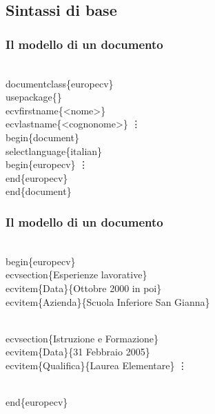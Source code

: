\documentclass[svgnames,%
	ucs,%
	pdftex]{guitbeamer}
\begin{document}
\subsection{Sintassi di base}
\begin{frame}
  \frametitle{Il modello di un documento}
	\begin{LaTeXcode}
		\\documentclass\{\alert{europecv}\}\n
	  \onslide<2->
		\\usepackage\{<nome-package>\}\n
	  \onslide<3->
		\alert{\\ecvfirstname\{}<nome>\alert{\}}\n
		\alert{\\ecvlastname\{}<cognonome>\alert{\}}\n
		\hspace*{10ex}\vdots\n
	  \smallskip
	  \onslide<4->
		\\begin\{document\}\n
	  \onslide<5->
		\\selectlanguage\{italian\}\n
	  \onslide<6->
		\hspace*{5ex}\\begin\{\alert{europecv}\}\n
		\hspace*{15ex}\vdots\n
		\hspace*{5ex}\\end\{\alert{europecv}\}\n
	  \onslide<4->
		\smallskip
		\\end\{document\}
	\end{LaTeXcode}
\end{frame}
\begin{frame}
  \frametitle{Il modello di un documento}
	\begin{LaTeXcode}
		\\begin\{europecv\}\n
	  \onslide<2->
		\hspace*{2ex}\alert{\\ecvsection\{}Esperienze lavorative\alert{\}}\n
	  \onslide<3->
		\hspace*{5ex}\alert{\\ecvitem\{}Data\alert{\}\{}Ottobre 2000 in poi\alert{\}}\n
		\hspace*{5ex}\alert{\\ecvitem\{}Azienda\alert{\}\{}Scuola Inferiore San Gianna\alert{\}}\n

	  \smallskip
	  \onslide<4->
		\hspace*{2ex}\\ecvsection\{Istruzione e Formazione\}\n
		\hspace*{5ex}\\ecvitem\{Data\}\{31 Febbraio 2005\}\n
		\hspace*{5ex}\\ecvitem\{Qualifica\}\{Laurea Elementare\}\n
		\hspace*{15ex}\vdots\n
		
	  \smallskip
	  \onslide<1->
		\smallskip
		\\end\{europecv\}
	\end{LaTeXcode}
\end{frame}
\end{document}
